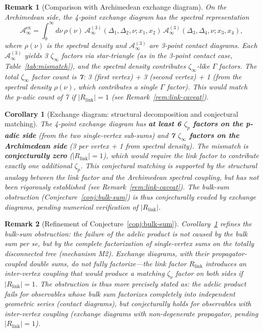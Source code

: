 \documentclass[11pt,a4paper]{article}
\newtheorem{corollary}{Corollary}
\newtheorem{remark}{Remark}
\begin{document}
\begin{remark}[Comparison with Archimedean exchange diagram]
\label{rem:exch-arch}
On the Archimedean side, the 4-point exchange diagram has the spectral representation
\begin{equation}
\label{eq:arch-exch}
\mathcal{A}^{\mathrm{ex}}_{\infty} = \int_0^\infty d\nu\, \rho(\nu) \, \mathcal{A}^{(3)}_\infty(\Delta_1, \Delta_2, \nu; x_1, x_2) \, \mathcal{A}^{(3)}_\infty(\Delta_3, \Delta_4, \nu; x_3, x_4),
\end{equation}
where $\rho(\nu)$ is the spectral density and $\mathcal{A}^{(3)}_\infty$ are 3-point contact diagrams. Each $\mathcal{A}^{(3)}_\infty$ yields 3 $\zeta_\infty$ factors via star-triangle (as in the 3-point contact case, Table~\ref{tab:mismatch}), and the spectral density contributes $\zeta_\infty$-like $\Gamma$ factors. The total $\zeta_\infty$ factor count is \textbf{7}: 3 (first vertex) + 3 (second vertex) + 1 (from the spectral density $\rho(\nu)$, which contributes a single $\Gamma$ factor). This would match the p-adic count of 7 if $|R_{\mathrm{link}}| = 1$ (see Remark~\ref{rem:link-caveat}).
\end{remark}

\begin{corollary}[Exchange diagram: structural decomposition and conjectural matching]
\label{cor:exchange}
The 4-point exchange diagram has \textbf{at least 6 $\zeta_p$ factors on the p-adic side} (from the two single-vertex sub-sums) and \textbf{7 $\zeta_\infty$ factors on the Archimedean side} (3 per vertex + 1 from spectral density). The mismatch is \textbf{conjecturally zero} ($|R_{\mathrm{link}}| = 1$), which would require the link factor to contribute exactly one additional $\zeta_p$. This conjectural matching is supported by the structural analogy between the link factor and the Archimedean spectral coupling, but has \emph{not} been rigorously established (see Remark~\ref{rem:link-caveat}). The bulk-sum obstruction (Conjecture~\ref{conj:bulk-sum}) is thus \emph{conjecturally evaded} by exchange diagrams, pending numerical verification of $|R_{\mathrm{link}}|$.
\end{corollary}

\begin{remark}[Refinement of Conjecture~\ref{conj:bulk-sum}]
\label{rem:refine}
Corollary~\ref{cor:exchange} refines the bulk-sum obstruction: the failure of the adelic product is not caused by the bulk sum per se, but by the \emph{complete factorization} of single-vertex sums on the totally disconnected tree (mechanism M2). Exchange diagrams, with their propagator-coupled double sums, do not fully factorize---the link factor $R_{\mathrm{link}}$ introduces an inter-vertex coupling that would produce a matching $\zeta_\nu$ factor on both sides if $|R_{\mathrm{link}}| = 1$. The obstruction is thus more precisely stated as: \emph{the adelic product fails for observables whose bulk sum factorizes completely into independent geometric series (contact diagrams), but conjecturally holds for observables with inter-vertex coupling (exchange diagrams with non-degenerate propagator, pending $|R_{\mathrm{link}}| = 1$)}.
\end{remark}
\end{document}
